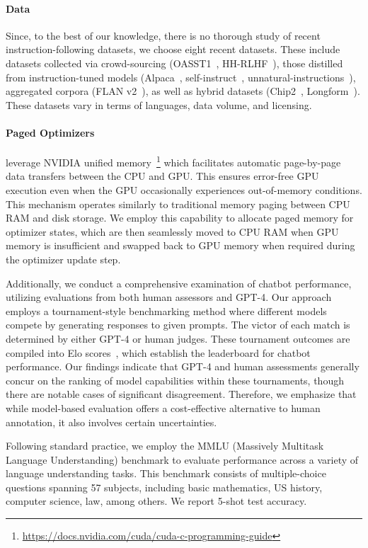 \paragraph{Data} Since, to the best of our knowledge, there is no thorough study of recent instruction-following datasets, we choose eight recent datasets. These include datasets collected via crowd-sourcing (OASST1~\citep{kopf2023openassistant}, HH-RLHF~\citep{bai2022training}), those distilled from instruction-tuned models (Alpaca~\citep{alpaca}, self-instruct~\citep{wang2022self}, unnatural-instructions~\citep{honovich2022unnatural}), aggregated corpora (FLAN v2~\citep{chung2022scaling}), as well as hybrid datasets (Chip2~\citep{laion2023}, Longform~\citep{koksal2023longform}). These datasets vary in terms of languages, data volume, and licensing.

\paragraph{Paged Optimizers} leverage NVIDIA unified memory~\footnote{\tiny \url{https://docs.nvidia.com/cuda/cuda-c-programming-guide}} which facilitates automatic page-by-page data transfers between the CPU and GPU. This ensures error-free GPU execution even when the GPU occasionally experiences out-of-memory conditions. This mechanism operates similarly to traditional memory paging between CPU RAM and disk storage. We employ this capability to allocate paged memory for optimizer states, which are then seamlessly moved to CPU RAM when GPU memory is insufficient and swapped back to GPU memory when required during the optimizer update step.

Additionally, we conduct a comprehensive examination of chatbot performance, utilizing evaluations from both human assessors and GPT-4. Our approach employs a tournament-style benchmarking method where different models compete by generating responses to given prompts. The victor of each match is determined by either GPT-4 or human judges. These tournament outcomes are compiled into Elo scores~\citep{elo1967proposed, elo1978rating}, which establish the leaderboard for chatbot performance. Our findings indicate that GPT-4 and human assessments generally concur on the ranking of model capabilities within these tournaments, though there are notable cases of significant disagreement. Therefore, we emphasize that while model-based evaluation offers a cost-effective alternative to human annotation, it also involves certain uncertainties.

Following standard practice, we employ the MMLU (Massively Multitask Language Understanding) benchmark \citep{hendrycksmeasuring} to evaluate performance across a variety of language understanding tasks. This benchmark consists of multiple-choice questions spanning 57 subjects, including basic mathematics, US history, computer science, law, among others. We report 5-shot test accuracy.


